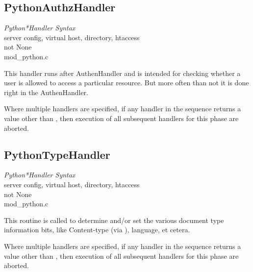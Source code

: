 \subsection{PythonAuthzHandler\label{dir-handlers-auzh}}

\emph{Python*Handler Syntax}\\
server config, virtual host, directory, htaccess\\
not None\\
mod_python.c

This handler runs after AuthenHandler and is intended for checking
whether a user is allowed to access a particular resource. But more
often than not it is done right in the AuthenHandler.

Where multiple handlers are specified, if any handler in the sequence
returns a value other than , then execution of all
subsequent handlers for this phase are aborted.

\subsection{PythonTypeHandler\label{dir-handlers-tph}}

\emph{Python*Handler Syntax}\\
server config, virtual host, directory, htaccess\\
not None\\
mod_python.c

This routine is called to determine and/or set the various document
type information bits, like Content-type (via ),
language, et cetera.

Where multiple handlers are specified, if any handler in the sequence
returns a value other than , then execution of all
subsequent handlers for this phase are aborted.

